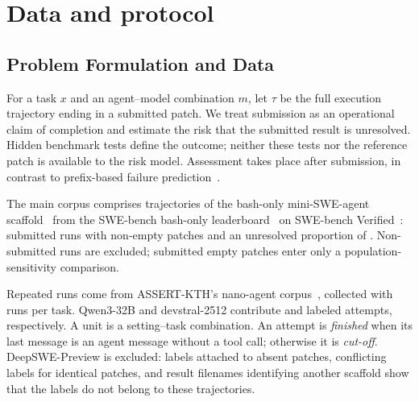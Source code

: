 
\section{Data and protocol}
\label{sec:data-protocol}

\subsection{Problem Formulation and Data}
\label{sec:problem-data}

For a task $x$ and an agent--model combination $m$, let $\tau$ be the full execution trajectory ending in a submitted patch. We treat submission as an operational claim of completion and estimate the risk that the submitted result is unresolved. Hidden benchmark tests define the outcome; neither these tests nor the reference patch is available to the risk model. Assessment takes place after submission, in contrast to prefix-based failure prediction~\cite{shi2026hardissue}.

The main corpus comprises trajectories of the bash-only mini-SWE-agent scaffold~\cite{minisweagent2025} from the SWE-bench bash-only leaderboard~\cite{swebench2026bashonly} on SWE-bench Verified~\cite{jimenez2024swebench,openai2024sweverified}:  submitted runs with non-empty patches and an unresolved proportion of . Non-submitted runs are excluded; submitted empty patches enter only a population-sensitivity comparison.

Repeated runs come from ASSERT-KTH's nano-agent corpus~\cite{bjarnason2026randomness}, collected with  runs per task. Qwen3-32B and devstral-2512 contribute  and  labeled attempts, respectively. A unit is a setting--task combination. An attempt is \emph{finished} when its last message is an agent message without a tool call; otherwise it is \emph{cut-off}. DeepSWE-Preview is excluded: labels attached to absent patches, conflicting labels for identical patches, and result filenames identifying another scaffold show that the labels do not belong to these trajectories.

